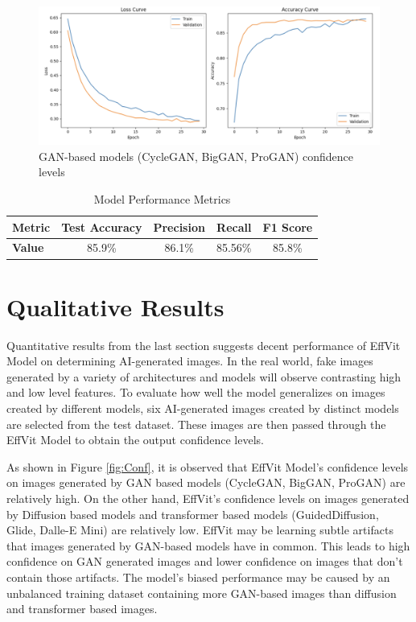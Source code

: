 \documentclass{article} %
\begin{document}
\begin{figure}[h]
    \begin{center}
        \includegraphics[scale=0.27]{figs/training curves.png}
    \end{center}
    \caption{GAN-based models (CycleGAN, BigGAN, ProGAN) confidence levels}
    \label{fig:Training_Curves}
\end{figure}

\begin{table}[h]
    \centering
    \caption{Model Performance Metrics}
    \label{tab:metrics}
    \begin{tabular}{lcccc}
        \toprule
        \textbf{Metric} & \textbf{Test Accuracy} & \textbf{Precision} & \textbf{Recall} & \textbf{F1 Score} \\
        \midrule
        \textbf{Value}  & 85.9\%                 & 86.1\%             & 85.56\%         & 85.8\%            \\
        \bottomrule
    \end{tabular}
\end{table}



\section{Qualitative Results}
Quantitative results from the last section suggests decent performance of EffVit Model on determining AI-generated images. In the real world, fake images generated by a variety of architectures and models will observe contrasting high and low level features. To evaluate how well the model generalizes on images created by different models, six AI-generated images created by distinct models are selected from the test dataset. These images are then passed through the EffVit Model to obtain the output confidence levels.

As shown in Figure \ref{fig:Conf}, it is observed that EffVit Model's confidence levels on images generated by GAN based models (CycleGAN, BigGAN, ProGAN) are relatively high. On the other hand, EffVit's confidence levels on images generated by Diffusion based models and transformer based models (GuidedDiffusion, Glide, Dalle-E Mini) are relatively low. EffVit may be learning subtle artifacts that images generated by GAN-based models have in common. This leads to high confidence on GAN generated images and lower confidence on images that don't contain those artifacts. The model's biased performance may be caused by an unbalanced training dataset containing more GAN-based images than diffusion and transformer based images.
\end{document}
